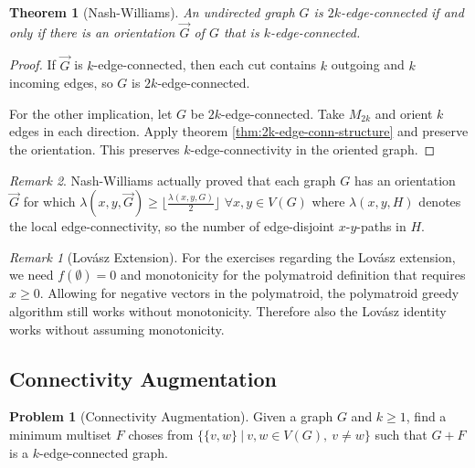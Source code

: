 \documentclass[11pt, a4paper]{article}
\newcommand{\floor}[1]{\lfloor #1 \rfloor}
\newcommand{\set}[1]{\{#1\}}
\newtheorem{theorem}{Theorem}[section]
\theoremstyle{remark}
\newtheorem{remark}[theorem]{Remark}
\newtheorem*{uremark}{Remark}
\theoremstyle{definition}
\newtheorem*{problem}{Problem}
\begin{document}
\begin{theorem}[Nash-Williams]
	An undirected graph $G$ is $2k$-edge-connected if and only if there is
	an orientation $\vec{G}$ of $G$ that is $k$-edge-connected.
\end{theorem}
\begin{proof}
	If $\vec{G}$ is $k$-edge-connected, then each cut contains $k$ outgoing
	and $k$ incoming edges, so $G$ is $2k$-edge-connected.

	For the other implication, let $G$ be $2k$-edge-connected. Take
	$M_{2k}$ and orient $k$ edges in each direction. Apply theorem
	\ref{thm:2k-edge-conn-structure} and preserve the orientation. This
	preserves $k$-edge-connectivity in the oriented graph.
\end{proof}

\begin{remark}
	Nash-Williams actually proved that each graph $G$ has an
	orientation $\vec{G}$ for which $\lambda(x,y,\vec{G})\geq
		\floor{\frac{\lambda(x,y,G)}{2}}$ $\forall x,y\in V(G)$ where
	$\lambda(x,y,H)$ denotes the local edge-connectivity, so the
	number of edge-disjoint $x$-$y$-paths in $H$.
\end{remark}


\begin{uremark}[Lovász Extension]
	For the exercises regarding the Lovász extension, we need $f(\emptyset)=0$
	and monotonicity for the polymatroid definition that requires $x\geq0$.
	Allowing for negative vectors in the polymatroid, the polymatroid greedy
	algorithm still works without monotonicity. Therefore also the Lovász
	identity works without assuming monotonicity.
\end{uremark}

\subsection{Connectivity Augmentation}

\begin{problem}[Connectivity Augmentation]
Given a graph $G$ and $k\geq 1$, find a minimum multiset $F$
choses from $\set{\set{v,w} \ |\ v,w\in V(G),\ v\neq w}$ such
that $G+F$ is a $k$-edge-connected graph.
\end{problem}
\end{document}
